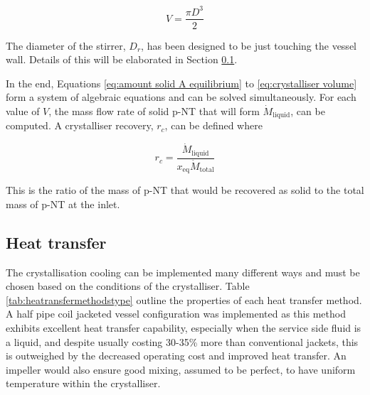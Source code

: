 \begin{equation} \label{eq:crystalliser volume}
    V = \frac{\pi D^3}{2} 
\end{equation}

\noindent The diameter of the stirrer, $D_r$, has been designed to be just touching the vessel wall. Details of this will be elaborated in Section \ref{sec:heat transfer crystalliser}.

In the end, Equations \ref{eq:amount solid A equilibrium} to \ref{eq:crystalliser volume} form a system of algebraic equations and can be solved simultaneously. For each value of $V$, the mass flow rate of solid p-NT that will form $\dot{M}_{\mathrm{liquid}}$, can be computed. A crystalliser recovery, $r_c$, can be defined where

\begin{equation}
    r_c = \frac{\dot{M}_{\mathrm{liquid}}}{x_{\mathrm{eq}} \dot{M}_{\mathrm{total}}}
\end{equation}

\noindent This is the ratio of the mass of p-NT that would be recovered as solid to the total mass of p-NT at the inlet.

\subsection{Heat transfer}\label{sec:heat transfer crystalliser}

The crystallisation cooling can be implemented many different ways and must be chosen based on the conditions of the crystalliser. Table \ref{tab:heatransfermethodstype} outline the properties of each heat transfer method. A half pipe coil jacketed vessel configuration was implemented as this method exhibits excellent heat transfer capability, especially when the service side fluid is a liquid, and despite usually costing 30-35\% more than conventional jackets, this is outweighed by the decreased operating cost and improved heat transfer. An impeller would also ensure good mixing, assumed to be perfect, to have uniform temperature within the crystalliser. 

